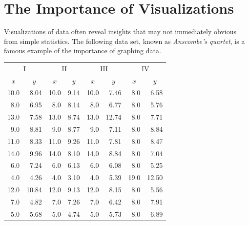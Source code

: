 \label{lab:DataVis}


\section*{The Importance of Visualizations} %

Visualizations of data often reveal insights that may not immediately obvious from simple statistics.
The following data set, known as \emph{Anscombe's quartet}, is a famous example of the importance of graphing data.

\begin{table}[H]
\small{
\begin{tabular}{rr|rr|rr|rr}
    \multicolumn{2}{c|}{I}    & \multicolumn{2}{|c|}{II} &
    \multicolumn{2}{|c|}{III} & \multicolumn{2}{|c}{IV} \\
    \multicolumn{1}{c}{$x$}   & \multicolumn{1}{c|}{$y$} &
    \multicolumn{1}{|c}{$x$}  & \multicolumn{1}{c|}{$y$} &
    \multicolumn{1}{|c}{$x$}  & \multicolumn{1}{c|}{$y$} &
    \multicolumn{1}{|c}{$x$}  & \multicolumn{1}{c}{$y$} \\
    \hline
    10.0 & 8.04  & 10.0 & 9.14 & 10.0 & 7.46  & 8.0  & 6.58  \\
    8.0  & 6.95  & 8.0  & 8.14 & 8.0  & 6.77  & 8.0  & 5.76  \\
    13.0 & 7.58  & 13.0 & 8.74 & 13.0 & 12.74 & 8.0  & 7.71  \\
    9.0  & 8.81  & 9.0  & 8.77 & 9.0  & 7.11  & 8.0  & 8.84  \\
    11.0 & 8.33  & 11.0 & 9.26 & 11.0 & 7.81  & 8.0  & 8.47  \\
    14.0 & 9.96  & 14.0 & 8.10 & 14.0 & 8.84  & 8.0  & 7.04  \\
    6.0  & 7.24  & 6.0  & 6.13 & 6.0  & 6.08  & 8.0  & 5.25  \\
    4.0  & 4.26  & 4.0  & 3.10 & 4.0  & 5.39  & 19.0 & 12.50 \\
    12.0 & 10.84 & 12.0 & 9.13 & 12.0 & 8.15  & 8.0  & 5.56  \\
    7.0  & 4.82  & 7.0  & 7.26 & 7.0  & 6.42  & 8.0  & 7.91  \\
    5.0  & 5.68  & 5.0  & 4.74 & 5.0  & 5.73  & 8.0  & 6.89  \\
\end{tabular}}
\end{table}


